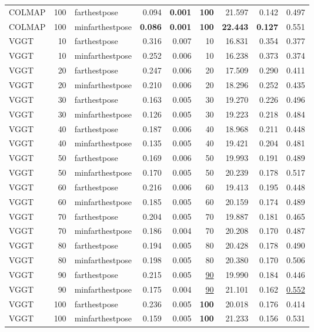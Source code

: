 \begin{table}[H]
\begin{tabular}{lrlrrrrrr}
COLMAP & 100 & farthestpose & 0.094 & \textbf{0.001} & \textbf{100} & 21.597 & 0.142 & 0.497 \\
COLMAP & 100 & minfarthestpose & \textbf{0.086} & \textbf{0.001} & \textbf{100} & \textbf{22.443} & \textbf{0.127} & 0.551 \\
VGGT & 10 & farthestpose & 0.316 & 0.007 & 10 & 16.831 & 0.354 & 0.377 \\
VGGT & 10 & minfarthestpose & 0.252 & 0.006 & 10 & 16.238 & 0.373 & 0.374 \\
VGGT & 20 & farthestpose & 0.247 & 0.006 & 20 & 17.509 & 0.290 & 0.411 \\
VGGT & 20 & minfarthestpose & 0.210 & 0.006 & 20 & 18.296 & 0.252 & 0.435 \\
VGGT & 30 & farthestpose & 0.163 & 0.005 & 30 & 19.270 & 0.226 & 0.496 \\
VGGT & 30 & minfarthestpose & 0.126 & 0.005 & 30 & 19.223 & 0.218 & 0.484 \\
VGGT & 40 & farthestpose & 0.187 & 0.006 & 40 & 18.968 & 0.211 & 0.448 \\
VGGT & 40 & minfarthestpose & 0.135 & 0.005 & 40 & 19.421 & 0.204 & 0.481 \\
VGGT & 50 & farthestpose & 0.169 & 0.006 & 50 & 19.993 & 0.191 & 0.489 \\
VGGT & 50 & minfarthestpose & 0.170 & 0.005 & 50 & 20.239 & 0.178 & 0.517 \\
VGGT & 60 & farthestpose & 0.216 & 0.006 & 60 & 19.413 & 0.195 & 0.448 \\
VGGT & 60 & minfarthestpose & 0.185 & 0.005 & 60 & 20.159 & 0.174 & 0.489 \\
VGGT & 70 & farthestpose & 0.204 & 0.005 & 70 & 19.887 & 0.181 & 0.465 \\
VGGT & 70 & minfarthestpose & 0.186 & 0.004 & 70 & 20.208 & 0.170 & 0.487 \\
VGGT & 80 & farthestpose & 0.194 & 0.005 & 80 & 20.428 & 0.178 & 0.490 \\
VGGT & 80 & minfarthestpose & 0.198 & 0.005 & 80 & 20.380 & 0.170 & 0.506 \\
VGGT & 90 & farthestpose & 0.215 & 0.005 & \underline{90} & 19.990 & 0.184 & 0.446 \\
VGGT & 90 & minfarthestpose & 0.175 & 0.004 & \underline{90} & 21.101 & 0.162 & \underline{0.552} \\
VGGT & 100 & farthestpose & 0.236 & 0.005 & \textbf{100} & 20.018 & 0.176 & 0.414 \\
VGGT & 100 & minfarthestpose & 0.159 & 0.005 & \textbf{100} & 21.233 & 0.156 & 0.531 \\
\bottomrule
\end{tabular}
\end{table}